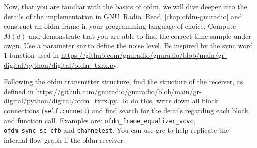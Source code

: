 Now, that you are familiar with the basics of \gls{ofdm}, we will dive deeper into the details of the implementation in GNU~Radio. Read~\cref{chap:ofdm-gnuradio} and construct an \gls{ofdm} frame in your programming language of choice. Compute $M(d)$ and demonstrate that you are able to find the correct time sample under \gls{awgn}. Use a parameter \gls{snr} to define the noise level. Be inspired by the sync word 1 function used in \url{https://github.com/gnuradio/gnuradio/blob/main/gr-digital/python/digital/ofdm_txrx.py}.

Following the \gls{ofdm} transmitter structure, find the structure of the receiver, as defined in \url{https://github.com/gnuradio/gnuradio/blob/main/gr-digital/python/digital/ofdm_txrx.py}. To do this, write down all block connections (\texttt{self.connect}) and find search for the details regarding each block and function call. Examples are: \texttt{ofdm_frame_equalizer_vcvc}, \texttt{ofdm_sync_sc_cfb} and \texttt{channelest}. You can use \gls{grc} to help replicate the internal flow graph if the \gls{ofdm} receiver.